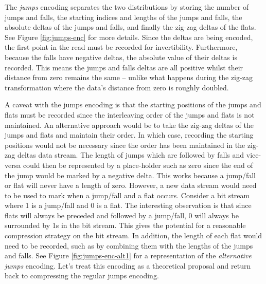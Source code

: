 


The \textit{jumps} encoding separates the two distributions by storing the number of
jumps and falls, the starting indices and lengths of the jumps and falls, the
absolute deltas of the jumps and falls, and finally the zig-zag deltas of the
flats. See Figure \ref{fig:jumps-enc} for more details. Since the deltas are
being encoded, the first point in the read must be recorded for invertibility.
Furthermore, because the falls have negative deltas, the absolute value of their
deltas is recorded. This means the jumps and falls deltas are all positive
whilst their distance from zero remains the same -- unlike what happens during
the zig-zag transformation where the data's distance from zero is roughly
doubled.



A caveat with the jumps encoding is that the starting positions of the jumps and flats
must be recorded since the interleaving order of the jumps and flats is not
maintained. An alternative approach would be to take the zig-zag deltas of the
jumps and flats and maintain their order. In which case, recording the starting
positions would not be necessary since the order has been maintained in the
zig-zag deltas data stream. The length of jumps which are followed by falls and
vice-versa could then be represented by a place-holder such as zero since the
end of the jump would be marked by a negative delta. This works because a
jump/fall or flat will never have a length of zero. However, a new data stream
would need to be used to mark when a jump/fall and a flat occurs. Consider a bit
stream where 1 is a jump/fall and 0 is a flat. The interesting observation is
that since flats will always be preceded and followed by a jump/fall, 0 will
always be surrounded by 1s in the bit stream. This gives the potential for
a reasonable compression strategy on the bit stream. In addition, the length of each
flat would need to be recorded, such as by combining them with the lengths of
the jumps and falls. See Figure \ref{fig:jumps-enc-alt1} for a representation of
the \textit{alternative jumps} encoding. Let's treat this encoding as a
theoretical proposal and return back to compressing the regular jumps encoding.



